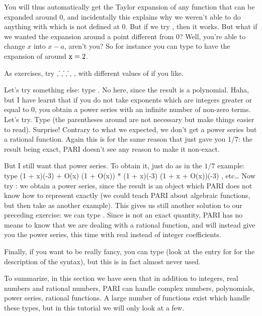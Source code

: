 You will thus automatically get the Taylor expansion of any function that can
be expanded around $0$, and incidentally this explains why we weren't
able to do anything with  which is not defined at 0. But if we
try , then it works. But what if we wanted the expansion
around a point different from 0? Well, you're able to change $x$ into
$x-a$, aren't you? So for instance you can type  to
have the expansion of  around ${\tt x}=2$.

\begingroup{}
As exercises, try , \h{}, \h
{}, \h{},\break
{}, with different values of  if you like.
\endgroup

Let's try something else: type . No  here, since
the result is a polynomial.  Haha, but I have learnt that if you do not take
exponents which are integers greater or equal to 0, you obtain a power series
with an infinite number of non-zero terms. Let's try.  Type
 (the parentheses around  are not necessary but
make things easier to read). Surprise! Contrary to what we expected, we don't
get a power series but a rational function. Again this is for the same reason
that  just gave you $1/7$: the result being exact, PARI doesn't see
any reason to make it non-exact.

But I still want that power series. To obtain it, just do as in the $1/7$
example: type
%
\bprog
(1 + x)\pow (-3) + O(x)
(1 + O(x)) * (1 + x)\pow (-3)
(1 + x + O(x))\pow (-3) {\rm, etc\dots}
\eprog
Now try : we obtain a power series, since the
result is an object which PARI does not know how to represent exactly (we
could teach PARI about algebraic functions, but then take 
as another example). This gives us still another solution to our preceding
exercise: we can type . Since  is not an exact
quantity, PARI has no means to know that we are dealing with a rational
function, and will instead give you the power series, this time with real
instead of integer coefficients.

Finally, if you want to be really fancy, you can type
 (look at the entry for  for the
description of the syntax), but this is in fact almost never used.
\smallskip

To summarize, in this section we have seen that in addition to integers, real
numbers and rational numbers, PARI can handle complex numbers, polynomials,
power series, rational functions. A large number of functions exist which
handle these types, but in this tutorial we will only look at a few.

